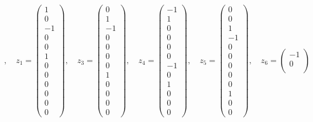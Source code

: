 \begin{loesung}
\[,\quad
z_1=\begin{pmatrix}
 1\\
 0\\
-1\\
 0\\
 0\\
 1\\
 0\\
 0\\
 0\\
 0\\
 0\\
 0
\end{pmatrix}
,\quad
z_3=\begin{pmatrix}
 0\\
 1\\
-1\\
 0\\
 0\\
 0\\
 0\\
 1\\
 0\\
 0\\
 0\\
 0
\end{pmatrix}
,\quad
z_4=\begin{pmatrix}
-1\\
 1\\
 0\\
 0\\
 0\\
 0\\
-1\\
 0\\
 1\\
 0\\
 0\\
 0
\end{pmatrix}
,\quad
z_5=
\begin{pmatrix}
 0\\
 0\\
 1\\
-1\\
 0\\
 0\\
 0\\
 0\\
 0\\
 1\\
 0\\
 0
\end{pmatrix}
,\quad
z_6=\begin{pmatrix}
-1\\
 0\\

\end{pmatrix}\]
\end{loesung}
